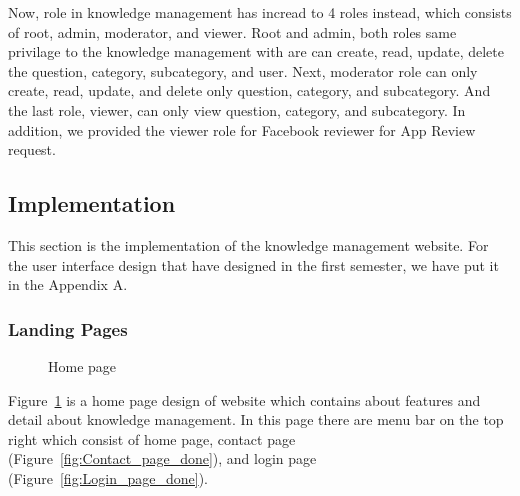 \documentclass[12pt,oneside,openright,a4paper]{cpe-english-project}
\begin{document}
		Now, role in knowledge management has incread to 4 roles instead, which consists of
		root, admin, moderator, and viewer.
		Root and admin, both roles same privilage to the knowledge management
		with are can create, read, update, delete the question, category, subcategory, and user.
		Next, moderator role can only create, read, update, and delete only question, category, and subcategory.
		And the last role, viewer, can only view question, category, and subcategory.
		In addition, we provided the viewer role for Facebook reviewer for App Review request.

\pagebreak

	\subsection{Implementation}
	This section is the implementation of the knowledge management website.
	For the user interface design that have designed in the first semester,
	we have put it in the Appendix A.

	\subsubsection{Landing Pages}
		\begin{figure}[!h]\centering
			\caption{Home page}\label{fig:Home_page_done}
		\end{figure}
		\begin{flushleft}
			Figure~\ref*{fig:Home_page_done} is a home page design of website which contains about features and detail about knowledge management. In this page there are menu bar on the top right which consist of home page, contact page (Figure~\ref*{fig:Contact_page_done}), and login page (Figure~\ref*{fig:Login_page_done}).
		\end{flushleft}
\end{document}
